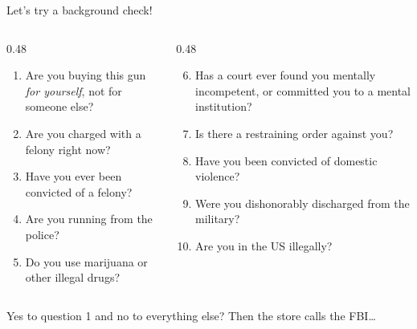 \documentclass[aspectratio=169,11pt]{beamer}
\begin{document}
\begin{frame}{Let's try a background check!}
  \vspace{0.5em}
  \begin{columns}[T]
    \begin{column}{0.48\textwidth}
      \begin{enumerate}\setlength{\itemsep}{0.35em}\small
        \item Are you buying this gun \emph{for yourself}, not for someone else?
        \item Are you charged with a felony right now?
        \item Have you ever been convicted of a felony?
        \item Are you running from the police?
        \item Do you use marijuana or other illegal drugs?
      \end{enumerate}
    \end{column}
    \begin{column}{0.48\textwidth}
      \begin{enumerate}\setcounter{enumi}{5}\setlength{\itemsep}{0.35em}\small
        \item Has a court ever found you mentally incompetent, or committed you to a mental institution?
        \item Is there a restraining order against you?
        \item Have you been convicted of domestic violence?
        \item Were you dishonorably discharged from the military?
        \item Are you in the US illegally?
      \end{enumerate}
    \end{column}
  \end{columns}
  \vspace{0.6em}
  \begin{center}
    \small \alert{Yes} to question 1 and \alert{no} to everything else? Then the store calls the FBI\ldots
  \end{center}
\end{frame}
\end{document}
